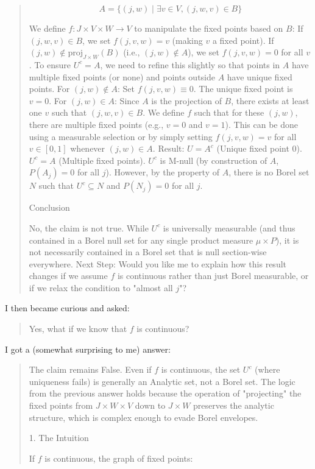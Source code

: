 \begin{Rem}
{\begin{quote}
$$A = \{ (j, w) \mid \exists v \in V, (j, w, v) \in B \}$$

We define $f: J \times V \times W \to V$ to manipulate the fixed points based on $B$:
If $(j, w, v) \in B$, we set $f(j, v, w) = v$ (making $v$ a fixed point).
If $(j, w) \notin \text{proj}_{J \times W}(B)$ (i.e., $(j, w) \notin A$), we set $f(j, v, w) = 0$ for all $v$.
To ensure $U^c = A$, we need to refine this slightly so that points in $A$ have multiple fixed points (or none) and points outside $A$ have unique fixed points.
For $(j, w) \notin A$: Set $f(j, v, w) \equiv 0$. The unique fixed point is $v=0$.
For $(j, w) \in A$: Since $A$ is the projection of $B$, there exists at least one $v$ such that $(j, w, v) \in B$. We define $f$ such that for these $(j, w)$, there are multiple fixed points (e.g., $v=0$ and $v=1$). This can be done using a measurable selection or by simply setting $f(j,v,w) = v$ for all $v \in [0,1]$ whenever $(j,w) \in A$.
Result:
$U = A^c$ (Unique fixed point $0$).
$U^c = A$ (Multiple fixed points).
$U^c$ is M-null (by construction of $A$, $P(A_j)=0$ for all $j$).
However, by the property of $A$, there is no Borel set $N$ such that $U^c \subseteq N$ and $P(N_j) = 0$ for all $j$.

Conclusion

No, the claim is not true. While $U^c$ is universally measurable (and thus contained in a Borel null set for any single product measure $\mu \times P$), it is not necessarily contained in a Borel set that is null section-wise everywhere.
Next Step:
Would you like me to explain how this result changes if we assume $f$ is continuous rather than just Borel measurable, or if we relax the condition to "almost all $j$"?
    \end{quote}
    I then became curious and asked:
    \begin{quote}
       Yes, what if we know that $f$ is continuous?
    \end{quote}
    I got a (somewhat surprising to me) answer:
    \begin{quote}
The claim remains False.
Even if $f$ is continuous, the set $U^c$ (where uniqueness fails) is generally an Analytic set, not a Borel set. The logic from the previous answer holds because the operation of "projecting" the fixed points from $J \times W \times V$ down to $J \times W$ preserves the analytic structure, which is complex enough to evade Borel envelopes.

1. The Intuition

If $f$ is continuous, the graph of fixed points:



\end{quote}}
\end{Rem}

